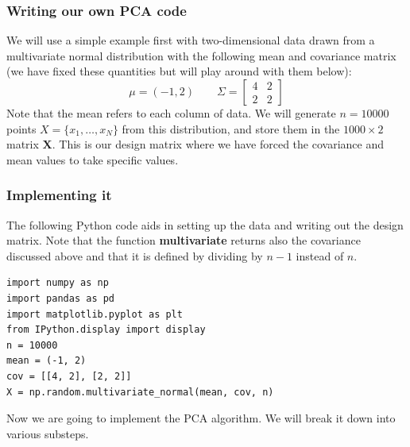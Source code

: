 \documentclass{beamer}
\begin{document}
\begin{frame}
\frametitle{Writing our own PCA code}

We will use a simple example first with two-dimensional data
drawn from a multivariate normal distribution with the following mean and covariance matrix (we have fixed these quantities but will play around with them below):
\[
\mu = (-1,2) \qquad \Sigma = \begin{bmatrix} 4 & 2 \\
2 & 2
\end{bmatrix}
\]
Note that the mean refers to each column of data. 
We will generate $n = 10000$ points $X = \{ x_1, \ldots, x_N \}$ from
this distribution, and store them in the $1000 \times 2$ matrix $\bm{X}$. This is our design matrix where we have forced the covariance and mean values to take specific values.
\end{frame}

\begin{frame}
\frametitle{Implementing it}

The following Python code aids in setting up the data and writing out the design matrix.
Note that the function \textbf{multivariate} returns also the covariance discussed above and that it is defined by dividing by $n-1$ instead of $n$.









\begin{verbatim}
import numpy as np
import pandas as pd
import matplotlib.pyplot as plt
from IPython.display import display
n = 10000
mean = (-1, 2)
cov = [[4, 2], [2, 2]]
X = np.random.multivariate_normal(mean, cov, n)

\end{verbatim}


Now we are going to implement the PCA algorithm. We will break it down into various substeps.
\end{frame}
\end{document}
